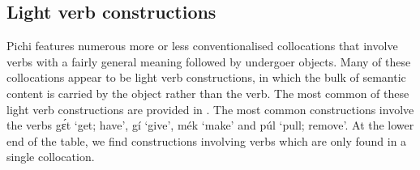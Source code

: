 \subsection{Light verb constructions}\label{sec:9.3.1}

Pichi features numerous more or less conventionalised collocations that involve verbs with a fairly general meaning followed by undergoer objects. Many of these collocations appear to be light verb constructions, in which the bulk of semantic content is carried by the object rather than the verb. The most common of these light verb constructions are provided in . The most common constructions involve the verbs gɛ́t ‘get; have’, gí ‘give’, mék ‘make’ and púl ‘pull; remove’. At the lower end of the table, we find constructions involving verbs which are only found in a single collocation. 

